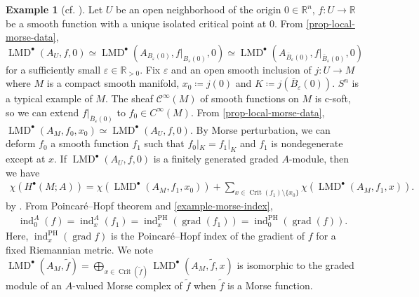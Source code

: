 \documentclass[a4paper,dvipdfmx,reqno,12pt]{amsart}
\theoremstyle{definition}
\newtheorem{example}[theorem]{Example}
\newtheorem{remark}[theorem]{Remark}
\newcommand{\deq}{\coloneqq}
\newcommand{\opn}[1]{\operatorname{#1}}
\numberwithin{equation}{section}
\begin{document}
\begin{example}[{cf. \cite[Exercise V.12]{MR1299726}}]
\label{example-poincare-hopf}
Let $U$ be an open neighborhood of the origin 
$0\in \mathbb{R}^{n}$,
$f\colon U\to \mathbb{R}$ be a smooth 
function 
with a unique isolated critical point at $0$. 
From \cref{prop-local-morse-data},
$\opn{LMD}^{\bullet}(A_U,f,0)\simeq 
\opn{LMD}^{\bullet}(A_{B_{\varepsilon}(0)},
f|_{B_{\varepsilon}(0)},0)\simeq 
\opn{LMD}^{\bullet}(A_{\bar{B}_{\varepsilon}(0)},
f|_{\bar{B}_{\varepsilon}(0)},0)$ 
for a sufficiently small $\varepsilon \in \mathbb{R}_{>0}$.
Fix $\varepsilon$ and an open smooth 
inclusion of $j\colon U \to M$
where $M$ is a compact smooth manifold,
$x_0\deq j(0)$ and $K\deq j(\bar{B}_{\varepsilon}(0))$. 
$S^{n}$ is a typical example of $M$.
The sheaf $\mathcal{C}^{\infty}(M)$ of smooth functions 
on $M$ is c-soft, so we can extend
$f|_{\bar{B}_{\varepsilon}(0)}$ to 
$f_0\in C^{\infty}(M)$.
From \cref{prop-local-morse-data}, 
$\opn{LMD}^{\bullet}(A_M,f_0,x_0)
\simeq \opn{LMD}^{\bullet}(A_U,f,0)$.
By Morse perturbation, we can deform 
$f_0$ a smooth function $f_1$ such that 
$f_0|_{K}=f_1|_K$ and $f_1$ is nondegenerate except at 
$x$. If $\opn{LMD}^{\bullet}(A_U,f,0)$ is 
a finitely generated graded $A$-module,
then we have
\begin{align} \label{equation-local-poincare-hopf}
\chi(H^{\bullet}(M;A))=
\chi(\opn{LMD}^{\bullet}(A_M,f_1,x_0))+
\sum_{x\in \opn{Crit}(f_1)\setminus \{x_0\}}
\chi(\opn{LMD}^{\bullet}(A_M,f_1,x)).
\end{align}
by \cite[Proposition 5.4.20]{MR1299726}.
From Poincar\'e--Hopf theorem and 
\cref{example-morse-index}, 
\begin{align} \label{equation-poincare-hopf}
\opn{ind}_0^{A}(f)=
\opn{ind}_x^{A}(f_1) =
\opn{ind}_x^{\opn{PH}}(\opn{grad}(f_1))=
\opn{ind}_0^{\opn{PH}}(\opn{grad}(f)). 
\end{align}
Here, $\opn{ind}^{\opn{PH}}_x(\opn{grad} f)$ is the 
Poincar\'e--Hopf index of the gradient of $f$ 
for a fixed Riemannian metric.
We note
$\opn{LMD}^{\bullet}(A_M,\tilde{f})=
\bigoplus_{x\in \opn{Crit}(\tilde{f})}
\opn{LMD}^{\bullet}(A_M,\tilde{f},x)$ is isomorphic
to the graded module of an $A$-valued Morse complex of 
$\tilde{f}$ when $\tilde{f}$ is a Morse function.
\end{example}








\end{document}
